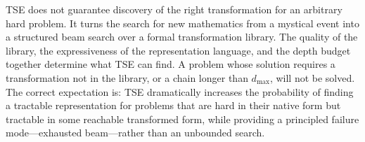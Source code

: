 TSE does not guarantee discovery of the right transformation for an arbitrary hard problem. It turns the search for new mathematics from a mystical event into a structured beam search over a formal transformation library. The quality of the library, the expressiveness of the representation language, and the depth budget together determine what TSE can find. A problem whose solution requires a transformation not in the library, or a chain longer than $d_{\max}$, will not be solved. The correct expectation is: TSE dramatically increases the probability of finding a tractable representation for problems that are hard in their native form but tractable in some reachable transformed form, while providing a principled failure mode---exhausted beam---rather than an unbounded search.
